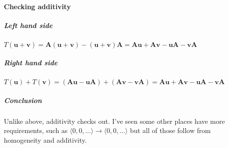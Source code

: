 \documentclass{article}
\begin{document}
            \paragraph{Checking additivity}
                \subparagraph{Left hand side}
                    $T(\mathbf{u}+\mathbf{v})=\mathbf{A}(\mathbf{u}+\mathbf{v})-(\mathbf{u}+\mathbf{v})\mathbf{A}=\mathbf{Au}+\mathbf{Av}-\mathbf{uA}-\mathbf{vA}$
                \subparagraph{Right hand side}
                    $T(\mathbf{u})+T(\mathbf{v})=(\mathbf{Au}-\mathbf{uA})+(\mathbf{Av}-\mathbf{vA})=\mathbf{Au}+\mathbf{Av}-\mathbf{uA}-\mathbf{vA}$
                \subparagraph{Conclusion}
                    Unlike above, additivity checks out. I've seen some other places have more requirements,
                    such as $\langle 0, 0, \dots \rangle \rightarrow \langle 0, 0, \dots \rangle$
                    but all of those follow from homogeneity and additivity.
\end{document}
